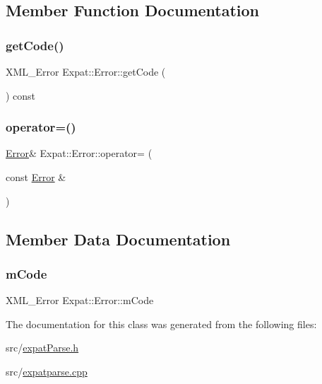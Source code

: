 \subsection{Member Function Documentation}
\hypertarget{class_expat_1_1_error_a9a0d1a9ca664b60284c481ba094dac1e}{}\label{class_expat_1_1_error_a9a0d1a9ca664b60284c481ba094dac1e} 
\subsubsection{\texorpdfstring{get\+Code()}{getCode()}}
{\footnotesize\ttfamily X\+M\+L\+\_\+\+Error Expat\+::\+Error\+::get\+Code (\begin{DoxyParamCaption}{ }\end{DoxyParamCaption}) const\hspace{0.3cm}{\ttfamily [inline]}}

\hypertarget{class_expat_1_1_error_ace2f59b903c510d0ac58613f3a2c6e4a}{}\label{class_expat_1_1_error_ace2f59b903c510d0ac58613f3a2c6e4a} 
\subsubsection{\texorpdfstring{operator=()}{operator=()}}
{\footnotesize\ttfamily \hyperlink{class_expat_1_1_error}{Error}\& Expat\+::\+Error\+::operator= (\begin{DoxyParamCaption}\item[{const \hyperlink{class_expat_1_1_error}{Error} \&}]{ }\end{DoxyParamCaption})\hspace{0.3cm}{\ttfamily [default]}}



\subsection{Member Data Documentation}
\hypertarget{class_expat_1_1_error_a6536d64df7df917a68f5984aaf2108a1}{}\label{class_expat_1_1_error_a6536d64df7df917a68f5984aaf2108a1} 
\subsubsection{\texorpdfstring{m\+Code}{mCode}}
{\footnotesize\ttfamily X\+M\+L\+\_\+\+Error Expat\+::\+Error\+::m\+Code\hspace{0.3cm}{\ttfamily [protected]}}



The documentation for this class was generated from the following files\+:\begin{DoxyCompactItemize}
\item 
src/\hyperlink{expat_parse_8h}{expat\+Parse.\+h}\item 
src/\hyperlink{expatparse_8cpp}{expatparse.\+cpp}\end{DoxyCompactItemize}
